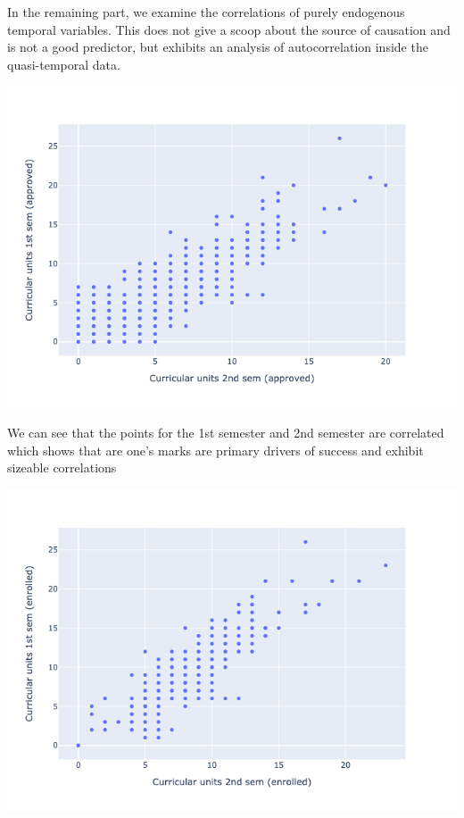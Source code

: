 \documentclass[
  letterpaper,
  DIV=11,
  numbers=noendperiod]{scrartcl}
\begin{document}
In the remaining part, we examine the correlations of purely endogenous
temporal variables. This does not give a scoop about the source of
causation and is not a good predictor, but exhibits an analysis of
autocorrelation inside the quasi-temporal data.

\includegraphics{report_AzadhdhinNedalYunisAlFraijat_files/figure-pdf/cell-54-output-1.png}

We can see that the points for the 1st semester and 2nd semester are
correlated which shows that are one's marks are primary drivers of
success and exhibit sizeable correlations

\includegraphics{report_AzadhdhinNedalYunisAlFraijat_files/figure-pdf/cell-55-output-1.png}
\end{document}
